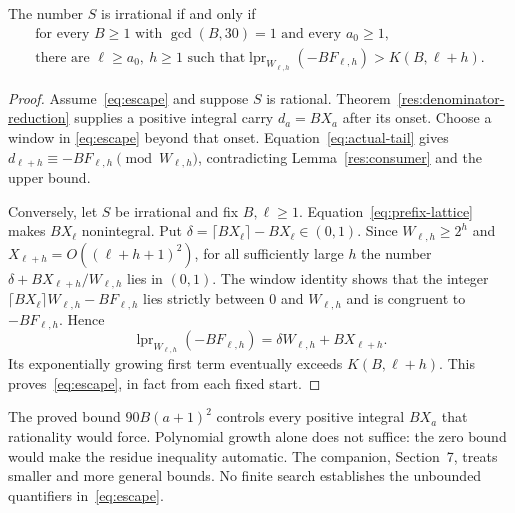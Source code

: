 \documentclass[11pt]{article}
\begin{document}
\begin{theorem}\label{res:windowconsumer}
The number $S$ is irrational if and only if
\begin{equation}\label{eq:escape}
 \begin{gathered}
 \text{for every }B\ge1\text{ with }\gcd(B,30)=1
 \text{ and every }a_0\ge1,\\
 \text{there are }\ell\ge a_0,\ h\ge1\text{ such that}
 \operatorname{lpr}_{W_{\ell,h}}(-BF_{\ell,h})>K(B,\ell+h).
 \end{gathered}
\end{equation}
\end{theorem}
\begin{proof}
Assume~\eqref{eq:escape} and suppose $S$ is rational.
Theorem~\ref{res:denominator-reduction} supplies a positive integral
carry $d_a=BX_a$ after its onset.  Choose a window in
\eqref{eq:escape} beyond that onset.  Equation~\eqref{eq:actual-tail}
gives $d_{\ell+h}\equiv-BF_{\ell,h}\pmod{W_{\ell,h}}$, contradicting
Lemma~\ref{res:consumer} and the upper bound.

Conversely, let $S$ be irrational and fix $B,\ell\ge1$.
Equation~\eqref{eq:prefix-lattice} makes $BX_\ell$ nonintegral.
Put $\delta=\lceil BX_\ell\rceil-BX_\ell\in(0,1)$.
Since $W_{\ell,h}\ge2^h$ and $X_{\ell+h}=O((\ell+h+1)^2)$, for all
sufficiently large $h$ the number
$\delta+BX_{\ell+h}/W_{\ell,h}$ lies in $(0,1)$.  The window identity
shows that the integer
$\lceil BX_\ell\rceil W_{\ell,h}-BF_{\ell,h}$ lies strictly between
$0$ and $W_{\ell,h}$ and is congruent to $-BF_{\ell,h}$.  Hence
\[
 \operatorname{lpr}_{W_{\ell,h}}(-BF_{\ell,h})
 =\delta W_{\ell,h}+BX_{\ell+h}.
\]
Its exponentially growing first term eventually exceeds
$K(B,\ell+h)$.  This proves~\eqref{eq:escape}, in fact from each fixed start.
\end{proof}


The proved bound $90B(a+1)^2$ controls every positive integral $BX_a$
that rationality would force.  Polynomial growth alone does not suffice:
the zero bound would make the residue inequality automatic.  The
companion, Section~7, treats smaller and more general bounds.  No finite
search establishes the unbounded quantifiers in~\eqref{eq:escape}.
\end{document}
